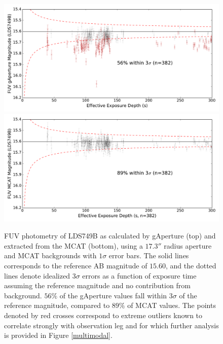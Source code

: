 \documentclass[preprint]{aastex}
\begin{document}
\begin{figure}[t!]
\includegraphics[scale=0.6]{Fig07a.pdf}\\
\includegraphics[scale=0.6]{Fig07b.pdf}
\caption{FUV photometry of LDS749B as calculated by gAperture (top) and extracted from the MCAT (bottom), using a $17.3''$ radius aperture and MCAT backgrounds with $1\sigma$ error bars. The solid lines corresponds to the reference AB magnitude of $15.60$, and the dotted lines denote idealized $3\sigma$ errors as a function of exposure time assuming the reference magnitude and no contribution from background. $56\%$ of the gAperture values fall within $3\sigma$ of the reference magnitude, compared to $89\%$ of MCAT values. The points denoted by red crosses correspond to extreme outliers known to correlate strongly with observation leg and for which further analysis is provided in Figure \ref{multimodal}.
\label{ldsabsphotfuv}}
\end{figure}
\clearpage
\end{document}

